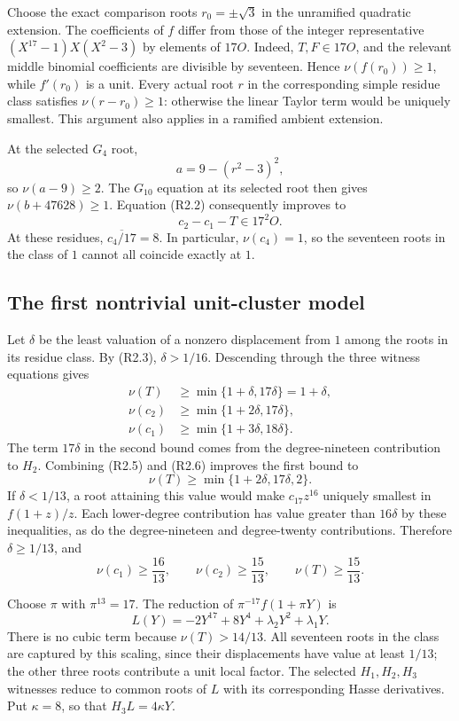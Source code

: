 \documentclass[
  british,
  10pt,
  a4paper,
]{article}
\begin{document}
Choose the exact comparison roots \(r_0=\pm\sqrt3\) in the unramified
quadratic extension. The coefficients of \(f\) differ from those of the
integer representative \((X^{17}-1)X(X^2-3)\) by elements of \(17O\).
Indeed, \(T,F\in17O\), and the relevant middle binomial coefficients are
divisible by seventeen. Hence \(\nu(f(r_0))\ge1\), while \(f'(r_0)\) is
a unit. Every actual root \(r\) in the corresponding simple residue
class satisfies \(\nu(r-r_0)\ge1\): otherwise the linear Taylor term
would be uniquely smallest. This argument also applies in a ramified
ambient extension.

At the selected \(G_4\) root, \[
a=9-(r^2-3)^2,
\] so \(\nu(a-9)\ge2\). The \(G_{10}\) equation at its selected root
then gives \(\nu(b+47628)\ge1\). Equation (R2.2) consequently improves
to \[
c_2-c_1-T\in17^2O.
\tag{R2.5}
\] At these residues, \(\overline{c_4/17}=8\). In particular,
\(\nu(c_4)=1\), so the seventeen roots in the class of \(1\) cannot all
coincide exactly at \(1\).

\subsection{The first nontrivial unit-cluster
model}\label{the-first-nontrivial-unit-cluster-model}

Let \(\delta\) be the least valuation of a nonzero displacement from
\(1\) among the roots in its residue class. By (R2.3), \(\delta>1/16\).
Descending through the three witness equations gives \[
\begin{aligned}
\nu(T)&\ge\min\{1+\delta,17\delta\}=1+\delta,\\
\nu(c_2)&\ge\min\{1+2\delta,17\delta\},\\
\nu(c_1)&\ge\min\{1+3\delta,18\delta\}.
\end{aligned}
\tag{R2.6}
\] The term \(17\delta\) in the second bound comes from the
degree-nineteen contribution to \(H_2\). Combining (R2.5) and (R2.6)
improves the first bound to \[
\nu(T)\ge\min\{1+2\delta,17\delta,2\}.
\] If \(\delta<1/13\), a root attaining this value would make
\(c_{17}z^{16}\) uniquely smallest in \(f(1+z)/z\). Each lower-degree
contribution has value greater than \(16\delta\) by these inequalities,
as do the degree-nineteen and degree-twenty contributions. Therefore
\(\delta\ge1/13\), and \[
\nu(c_1)\ge\frac{16}{13},\qquad
\nu(c_2)\ge\frac{15}{13},\qquad
\nu(T)\ge\frac{15}{13}.
\tag{R2.7}
\]

Choose \(\pi\) with \(\pi^{13}=17\). The reduction of
\(\pi^{-17}f(1+\pi Y)\) is \[
L(Y)=-2Y^{17}+8Y^4+\lambda_2Y^2+\lambda_1Y.
\tag{R2.8}
\] There is no cubic term because \(\nu(T)>14/13\). All seventeen roots
in the class are captured by this scaling, since their displacements
have value at least \(1/13\); the other three roots contribute a unit
local factor. The selected \(H_1,H_2,H_3\) witnesses reduce to common
roots of \(L\) with its corresponding Hasse derivatives. Put
\(\kappa=8\), so that \(H_3L=4\kappa Y\).
\end{document}
